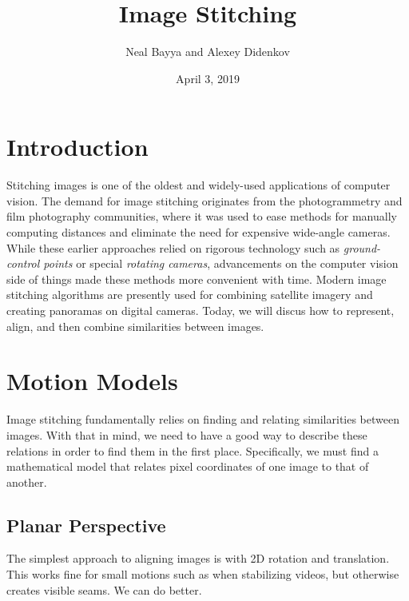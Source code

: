 \documentclass{article}
\title{Image Stitching}
\author{Neal Bayya and Alexey Didenkov}
\date{April 3, 2019}
\begin{document}
\maketitle

\section{Introduction}
Stitching images is one of the oldest and widely-used applications of computer vision.
The demand for image stitching originates from the photogrammetry and film photography communities, where it was used to ease methods for manually  computing distances and eliminate the need for expensive wide-angle cameras.
While these earlier approaches relied on rigorous technology such as \textit{ground-control points} or special \textit{rotating cameras}, advancements on the computer vision side of things made these methods more convenient with time.
Modern image stitching algorithms are presently used for combining satellite imagery and creating panoramas on digital cameras.
Today, we will discus how to represent, align, and then combine similarities between images.


\section{Motion Models}
Image stitching fundamentally relies on finding and relating similarities between images.
With that in mind, we need to have a good way to describe these relations in order to find them in the first place.
Specifically, we must find a mathematical model that relates pixel coordinates of one image to that of another.

\subsection{Planar Perspective}
The simplest approach to aligning images is with 2D rotation and translation.
This works fine for small motions such as when stabilizing videos, but otherwise creates visible seams.
We can do better.
\end{document}
